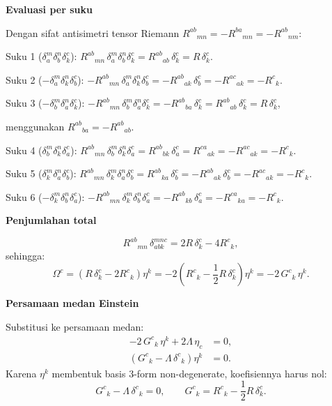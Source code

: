 \vspace{0.5em}
\noindent \textbf{Evaluasi per suku}

Dengan sifat antisimetri tensor Riemann $R^{ab}{}_{mn} = -R^{ba}{}_{mn} = -R^{ab}{}_{nm}$:

Suku 1 ($\delta^m_a \delta^n_b \delta^c_k$):
$R^{ab}{}_{mn}\, \delta^m_a \delta^n_b \delta^c_k = R^{ab}{}_{ab}\, \delta^c_k = R\, \delta^c_k$.

Suku 2 ($-\delta^m_a \delta^n_k \delta^c_b$):
$-R^{ab}{}_{mn}\, \delta^m_a \delta^n_k \delta^c_b = -R^{ab}{}_{ak}\, \delta^c_b = -R^{ac}{}_{ak} = -R^c{}_k$.

Suku 3 ($-\delta^m_b \delta^n_a \delta^c_k$):
$-R^{ab}{}_{mn}\, \delta^m_b \delta^n_a \delta^c_k = -R^{ab}{}_{ba}\, \delta^c_k = R^{ab}{}_{ab}\, \delta^c_k = R\, \delta^c_k$,

menggunakan $R^{ab}{}_{ba} = -R^{ab}{}_{ab}$.

Suku 4 ($\delta^m_b \delta^n_k \delta^c_a$):
$R^{ab}{}_{mn}\, \delta^m_b \delta^n_k \delta^c_a = R^{ab}{}_{bk}\, \delta^c_a = R^{ca}{}_{ak} = -R^{ac}{}_{ak} = -R^c{}_k$.

Suku 5 ($\delta^m_k \delta^n_a \delta^c_b$):
$R^{ab}{}_{mn}\, \delta^m_k \delta^n_a \delta^c_b = R^{ab}{}_{ka}\, \delta^c_b = -R^{ab}{}_{ak}\, \delta^c_b = -R^{ac}{}_{ak} = -R^c{}_k$.

Suku 6 ($-\delta^m_k \delta^n_b \delta^c_a$):
$-R^{ab}{}_{mn}\, \delta^m_k \delta^n_b \delta^c_a = -R^{ab}{}_{kb}\, \delta^c_a = -R^{ca}{}_{ka} = -R^c{}_k$.

\vspace{0.5em}
\noindent \textbf{Penjumlahan total}

\begin{equation}
    R^{ab}{}_{mn}\, \delta^{mnc}_{abk} = 2R\, \delta^c_k - 4R^c{}_k,
\end{equation}
sehingga:
\begin{equation}
    \Omega^c = \left(R\, \delta^c_k - 2R^c{}_k\right)\eta^k = -2\left(R^c{}_k - \frac{1}{2}R\, \delta^c_k\right)\eta^k = -2\, G^c{}_k\, \eta^k.
\end{equation}

\vspace{0.5em}
\noindent \textbf{Persamaan medan Einstein}

Substitusi ke persamaan medan:
\begin{align}
    -2\, G^c{}_k\, \eta^k + 2\Lambda\, \eta_c &= 0, \nonumber\\
    \left(G^c{}_k - \Lambda\, \delta^c{}_k\right)\eta^k &= 0.
\end{align}
Karena $\eta^k$ membentuk basis 3-form non-degenerate, koefisiennya harus nol:
\begin{equation}
    G^c{}_k - \Lambda\, \delta^c{}_k = 0, \qquad G^c{}_k = R^c{}_k - \frac{1}{2}R\, \delta^c_k.
\end{equation}

